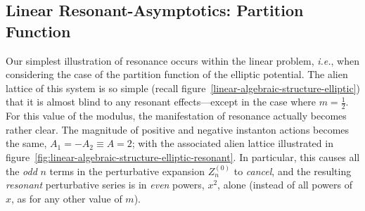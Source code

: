 \documentclass[11pt,a4paper]{article}
\begin{document}
\subsection{Linear Resonant-Asymptotics: Partition Function}\label{sec:linear-resonance}

Our simplest illustration of resonance occurs within the linear problem, \textit{i.e.}, when considering the case of the partition function of the elliptic potential. The alien lattice of this system is so simple (recall figure~\ref{linear-algebraic-structure-elliptic}) that it is almost blind to any resonant effects---except in the case where $m = \frac{1}{2}$. For this value of the modulus, the manifestation of resonance actually becomes rather clear. The magnitude of positive and negative instanton actions becomes the same, $A_1 = - A_2 \equiv A = 2$; with the associated alien lattice illustrated in figure~\ref{fig:linear-algebraic-structure-elliptic-resonant}. In particular, this causes all the \textit{odd} $n$ terms in the perturbative expansion $Z^{(0)}_n$ to \textit{cancel}, and the resulting \textit{resonant} perturbative series is in \textit{even} powers, $x^2$, alone (instead of all powers of $x$, as for any other value of $m$).
\end{document}
